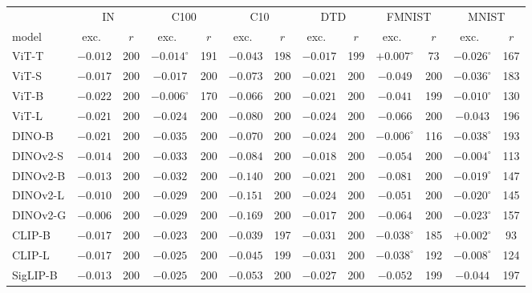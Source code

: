 \begin{table}[H]
\centering
\scriptsize
\setlength{\tabcolsep}{2.4pt}
\begin{tabular}{lcccccccccccc}
\toprule
 & \multicolumn{2}{c}{IN} & \multicolumn{2}{c}{C100} & \multicolumn{2}{c}{C10} & \multicolumn{2}{c}{DTD} & \multicolumn{2}{c}{FMNIST} & \multicolumn{2}{c}{MNIST} \\
model & exc.\ & $r$ & exc.\ & $r$ & exc.\ & $r$ & exc.\ & $r$ & exc.\ & $r$ & exc.\ & $r$ \\
\midrule
ViT-T & $-0.012$ & 200 & $-0.014^{\circ}$ & 191 & $-0.043$ & 198 & $-0.017$ & 199 & $+0.007^{\circ}$ & 73 & $-0.026^{\circ}$ & 167 \\
ViT-S & $-0.017$ & 200 & $-0.017$ & 200 & $-0.073$ & 200 & $-0.021$ & 200 & $-0.049$ & 200 & $-0.036^{\circ}$ & 183 \\
ViT-B & $-0.022$ & 200 & $-0.006^{\circ}$ & 170 & $-0.066$ & 200 & $-0.021$ & 200 & $-0.041$ & 199 & $-0.010^{\circ}$ & 130 \\
ViT-L & $-0.021$ & 200 & $-0.024$ & 200 & $-0.080$ & 200 & $-0.024$ & 200 & $-0.066$ & 200 & $-0.043$ & 196 \\
\midrule
DINO-B & $-0.021$ & 200 & $-0.035$ & 200 & $-0.070$ & 200 & $-0.024$ & 200 & $-0.006^{\circ}$ & 116 & $-0.038^{\circ}$ & 193 \\
DINOv2-S & $-0.014$ & 200 & $-0.033$ & 200 & $-0.084$ & 200 & $-0.018$ & 200 & $-0.054$ & 200 & $-0.004^{\circ}$ & 113 \\
DINOv2-B & $-0.013$ & 200 & $-0.032$ & 200 & $-0.140$ & 200 & $-0.021$ & 200 & $-0.081$ & 200 & $-0.019^{\circ}$ & 147 \\
DINOv2-L & $-0.010$ & 200 & $-0.029$ & 200 & $-0.151$ & 200 & $-0.024$ & 200 & $-0.051$ & 200 & $-0.020^{\circ}$ & 145 \\
DINOv2-G & $-0.006$ & 200 & $-0.029$ & 200 & $-0.169$ & 200 & $-0.017$ & 200 & $-0.064$ & 200 & $-0.023^{\circ}$ & 157 \\
\midrule
CLIP-B & $-0.017$ & 200 & $-0.023$ & 200 & $-0.039$ & 197 & $-0.031$ & 200 & $-0.038^{\circ}$ & 185 & $+0.002^{\circ}$ & 93 \\
CLIP-L & $-0.017$ & 200 & $-0.025$ & 200 & $-0.045$ & 199 & $-0.031$ & 200 & $-0.038^{\circ}$ & 192 & $-0.008^{\circ}$ & 124 \\
SigLIP-B & $-0.013$ & 200 & $-0.025$ & 200 & $-0.053$ & 200 & $-0.027$ & 200 & $-0.052$ & 199 & $-0.044$ & 197 \\
\bottomrule
\end{tabular}

\end{table}
